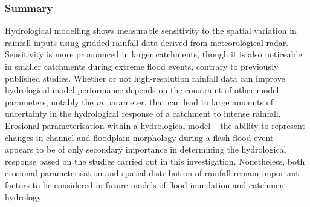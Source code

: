 \subsubsection{Summary}
Hydrological modelling shows measurable sensitivity to the spatial variation in rainfall inputs using gridded rainfall data derived from meteorological radar. Sensitivity is more pronounced in larger catchments, though it is also noticeable in smaller catchments during extreme flood events, contrary to previously published studies. Whether or not high-resolution  rainfall data can improve hydrological model performance depends on the constraint of other model parameters, notably the \(m\) parameter, that can lead to large amounts of uncertainty in the hydrological response of a catchment to intense rainfall. Erosional parameterisation within a hydrological model -- the ability to represent changes in channel and floodplain morphology during a flash flood event -- appears to be of only secondary importance in determining the hydrological response based on the studies carried out in this investigation. Nonetheless, both erosional parameterisation and spatial distribution of rainfall remain important factors to be considered in future models of flood inundation and catchment hydrology.




